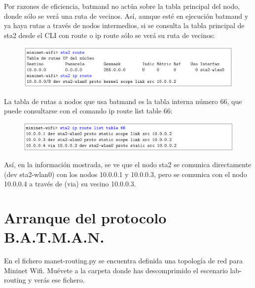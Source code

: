 \documentclass[12pt, a4paper]{report}
\begin{document}
Por razones de eficiencia, batmand no actúa sobre la tabla principal del nodo, donde sólo se verá una
ruta de vecinos. Así, aunque esté en ejecución batmand y ya haya rutas a través de nodos intermedios,
si se consulta la tabla principal de sta2 desde el CLI con route o ip route sólo se verá su ruta de
vecinos:
\begin{figure}[H]
	\centering
	\includegraphics[width=1\textwidth]{enunciado2}
\end{figure}
La tabla de rutas a nodos que usa batmand es la tabla interna número 66, que puede consultarse
con el comando ip route list table 66:
\begin{figure}[H]
	\centering
	\includegraphics[width=1\textwidth]{enunciado3}
\end{figure}
Así, en la información mostrada, se ve que el nodo sta2 se comunica directamente (dev sta2-wlan0)
con los nodos 10.0.0.1 y 10.0.0.3, pero se comunica con el nodo 10.0.0.4 a través de (via) su vecino
10.0.0.3.
\chapter{Arranque del protocolo B.A.T.M.A.N.}
En el fichero manet-routing.py se encuentra definida una topología de red para Mininet Wifi.
Muévete a la carpeta donde has descomprimido el escenario lab-routing y verás ese fichero.\\
\end{document}
